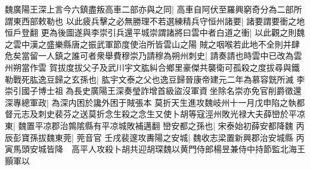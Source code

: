 魏廣陽王深上言今六鎮盡叛高車二部亦與之同|{
	高車自阿伏至羅興窮奇分為二部所謂東西部敕勒也}
以此疲兵擊之必無勝理不若選練精兵守恒州諸要|{
	諸要謂要衝之地恒戶登翻}
更為後圖遂與李崇引兵還平城崇謂諸將曰雲中者白道之衝|{
	以此觀之則魏之雲中漢之盛樂縣唐之振武軍節度使治所皆雲山之陽}
賊之咽喉若此地不全則并肆危矣當留一人鎮之誰可者衆舉費穆崇乃請穆為朔州刺史|{
	請奏請也時雲中已改為雲州朔當作雲}
賀拔度拔父子及武川宇文肱糾合鄉里豪傑共襲衛可孤殺之度拔尋與鐵勒戰死肱逸豆歸之玄孫也|{
	肱宇文泰之父也逸豆歸晉康帝建元二年為慕容皝所滅}
李崇引國子博士祖為長史廣陽王深奏瑩詐增首級盜沒軍資坐除名崇亦免官削爵徵還深專總軍政|{
	為深内困於讒外困于賊張本}
莫折天生進攻魏岐州十一月戊申陷之執都督元志及刺史裴芬之送莫折念生殺之念生又使卜胡等寇涇州敗光禄大夫薛巒於平凉東|{
	魏置平凉郡治鶉隂縣有平凉城敗補邁翻}
巒安都之孫也|{
	宋泰始初薛安都降魏}
丙辰彭寶孫拔魏東莞|{
	莞音官}
壬戌裴邃攻夀陽之安城|{
	魏收志梁置新興郡治安城縣}
丙寅馬頭安城皆降　高平人攻殺卜胡共迎胡琛魏以黄門侍郎楊昱兼侍中持節監北海王顥軍以

